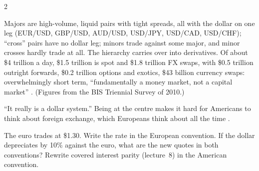 \begin{paracol}{2}
\begin{finance}
Majors are high-volume, liquid pairs with tight spreads, all with the dollar on one leg (EUR/USD, GBP/USD, AUD/USD, USD/JPY, USD/CAD, USD/CHF); ``cross'' pairs have no dollar leg; minors
trade against some major, and minor crosses hardly trade at all. The hierarchy carries over into derivatives. Of about \$4 trillion a day, \$1.5 trillion is spot and \$1.8 trillion FX swaps,
with \$0.5 trillion outright forwards, \$0.2 trillion options and exotics, \$43 billion currency swaps: overwhelmingly short term, ``fundamentally a money market, not a capital market''
. (Figures from the BIS Triennial Survey of 2010.)
\end{finance}

``It really is a dollar system.'' Being at the centre makes it hard for Americans to think about foreign exchange, which Europeans think about all the time
.

\begin{nfigure}
\caption{The hierarchy of currencies  (a stylised description, not a theory).}\label{fig:cm-currencies}
\end{nfigure}

\begin{exercise}[Conventions]
The euro trades at \$1.30. Write the rate in the European convention. If the dollar depreciates by 10\% against the euro, what are the new quotes in both conventions? Rewrite
covered interest parity (lecture~8) in the American convention.
\end{exercise}


\end{paracol}
